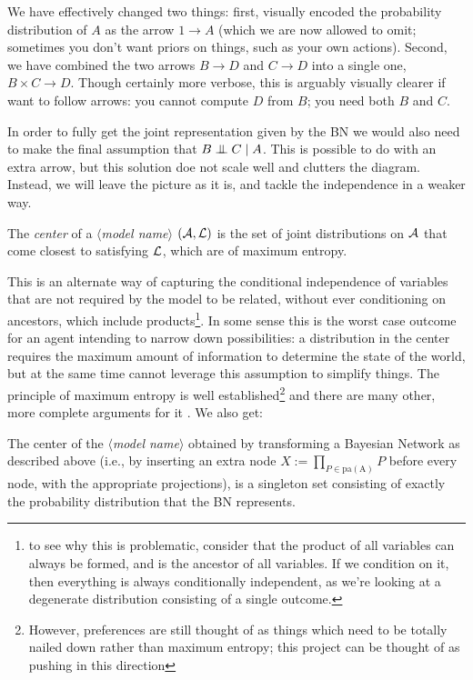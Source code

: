 \documentclass{article}
\newcommand\modelname{{\color{blue!50!black}$\langle$\itshape model name$\rangle$ }}
\begin{document}
	We have effectively changed two things: first, visually encoded the probability distribution of $A$ as the arrow $1 \to A$ (which we are now allowed to omit; sometimes you don't want priors on things, such as your own actions). Second, we have combined the two arrows $B \to D$ and $C \to D$ into a single one, $B \times C \to D$. Though certainly more verbose, this is arguably visually clearer if want to follow arrows: you cannot compute $D$ from $B$; you need both $B$ and $C$.
	
	In order to fully get the joint representation given by the BN we would also need to make the final assumption that $B \mathrel{\perp\mspace{-10mu}\perp} C \mid A$. This is possible to do with an extra arrow, but this solution doe not scale well and clutters the diagram. Instead, we will leave the picture as it is, and tackle the independence in a weaker way.
	
	\begin{defn*}
		The \emph{center} of a \modelname $(\cal A, L)$ is the set of joint distributions on $\cal A$ that come closest to satisfying $\cal L$, which are of maximum entropy.
	\end{defn*}

	This is an alternate way of capturing the conditional independence of variables that are not required by the model to be related, without ever conditioning on ancestors, which include products\footnote{to see why this is problematic, consider that the product of all variables can always be formed, and is the ancestor of all variables. If we condition on it, then everything is always conditionally independent, as we're looking at a degenerate distribution consisting of a single outcome.}.  In some sense this is the worst case outcome for an agent intending to narrow down possibilities: a distribution in the center requires the maximum amount of information to determine the state of the world, but at the same time cannot leverage this assumption to simplify things. The principle of maximum entropy is well established\footnote{However, preferences are still thought of as things which need to be totally nailed down rather than maximum entropy; this project can be thought of as pushing in this direction} and there are many other, more complete arguments for it . We also get:
	
	\begin{conj}
		The center of the \modelname obtained by transforming a Bayesian Network as described above (i.e., by inserting an extra node $X := \prod_{P \in \mathrm{pa(A)}} P$ before every node, with the appropriate projections), is a singleton set consisting of exactly the probability distribution that the BN represents.
	\end{conj}
\end{document}
